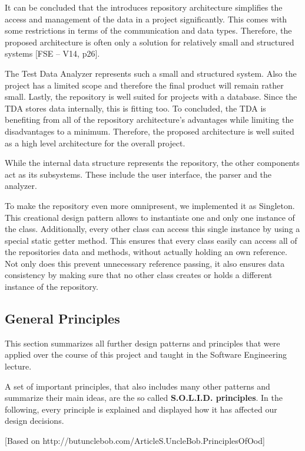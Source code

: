 It can be concluded that the introduces repository architecture simplifies the access and management of the data in a project significantly. This comes with some restrictions in terms of the communication and data types. Therefore, the proposed architecture is often only a solution for relatively small and structured systems [FSE – V14, p26].

The Test Data Analyzer represents such a small and structured system. Also the project has a limited scope and therefore the final product will remain rather small. Lastly, the repository is well suited for projects with a database. Since the TDA stores data internally, this is fitting too. To concluded, the TDA is benefiting from all of the repository architecture's advantages while limiting the disadvantages to a minimum. Therefore, the proposed architecture is well suited as a high level architecture for the overall project.

While the internal data structure represents the repository, the other components act as its subsystems. These include the user interface, the parser and the analyzer.

To make the repository even more omnipresent, we implemented it as Singleton. This creational design pattern allows to instantiate one and only one instance of the class. Additionally, every other class can access this single instance by using a special static getter method. This ensures that every class easily can access all of the repositories data and methods, without actually holding an own reference. Not only does this prevent unnecessary reference passing, it also ensures data consistency by making sure that no other class creates or holds a different instance of the repository.

\subsection{General Principles}

This section summarizes all further design patterns and principles that were applied over the course of this project and taught in the Software Engineering lecture.

A set of important principles, that also includes many other patterns and summarize their main ideas, are the so called \textbf{S.O.L.I.D. principles}. In the following, every principle is explained and displayed how it has affected our design decisions.

[Based on http://butunclebob.com/ArticleS.UncleBob.PrinciplesOfOod]

